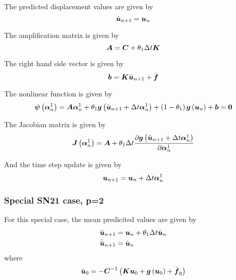 The predicted displacement values are given by
\begin{equation}
   \hat{\boldsymbol{u}}_{n+1} = \boldsymbol{u}_{n}
\end{equation}

The amplification matrix is given by
\begin{equation}
  \matr{A}=\matr{C}+\theta_{1}\Delta t \matr{K}
\end{equation}

The right hand side vector is given by
\begin{equation}
  \vectr{b}=\matr{K}\bar{\vectr{u}}_{n+1}+\bar{\vectr{f}}
\end{equation}

The nonlinear function is given by
\begin{equation}
  \fnof{\vectr{\psi}}{\vectr{\alpha}^{1}_{n}}=\matr{A}\vectr{\alpha}^{1}_{n}+\theta_{1}\fnof{\vectr{g}}{\hat{\vectr{u}}_{n+1}+ 
    \Delta t\vectr{\alpha}^{1}_{n}}+\pbrac{1-\theta_{1}}\fnof{\vectr{g}}{\vectr{u}_{n}}+\vectr{b}=\vectr{0}
\end{equation}

The Jacobian matrix is given by
\begin{equation}
  \fnof{\matr{J}}{\vectr{\alpha}^{1}_{n}}=\matr{A}+\theta_{1}\Delta t
  \delby{\fnof{\vectr{g}}{\hat{\vectr{u}}_{n+1}+\Delta t\vectr{\alpha}^{1}_{n}}}{\vectr{\alpha}^{1}_{n}}
\end{equation}

And the time step update is given by
\begin{equation}
    \boldsymbol{u}_{n+1} = \boldsymbol{u}_{n}+\Delta t\boldsymbol{\alpha}^{1}_{n}
\end{equation}

\subsubsection{Special SN21 case, p=2}

For this special case, the mean predicited values are given by
\begin{equation}
  \begin{split}
    \bar{\boldsymbol{u}}_{n+1} &= \boldsymbol{u}_{n}+\theta_{1}\Delta t\dot{\boldsymbol{u}}_{n}\\
    \dot{\bar{\boldsymbol{u}}}_{n+1} &= \dot{\boldsymbol{u}}_{n}
  \end{split}
\end{equation}
where
\begin{equation}
  \dot{\vectr{u}}_{0}=-\inverse{\matr{C}}\pbrac{\matr{K}\vectr{u}_{0}+\fnof{\vectr{g}}{\vectr{u}_{0}}+\bar{\vectr{f}}_{0}}
\end{equation}

